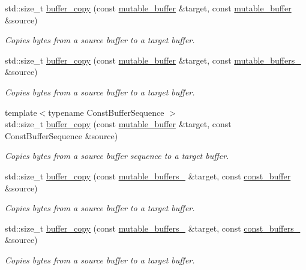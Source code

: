 \begin{DoxyCompactItemize}
std\+::size\+\_\+t \hyperlink{group__buffer__copy_gad7a03807f5083b423e1fff2173edf991}{buffer\+\_\+copy} (const \hyperlink{classasio_1_1mutable__buffer}{mutable\+\_\+buffer} \&target, const \hyperlink{classasio_1_1mutable__buffer}{mutable\+\_\+buffer} \&source)
\begin{DoxyCompactList}\small\item\em Copies bytes from a source buffer to a target buffer. \end{DoxyCompactList}\item 
std\+::size\+\_\+t \hyperlink{group__buffer__copy_ga8ed1b2c796b937a0b044df908ad4e3d8}{buffer\+\_\+copy} (const \hyperlink{classasio_1_1mutable__buffer}{mutable\+\_\+buffer} \&target, const \hyperlink{classasio_1_1mutable__buffers__1}{mutable\+\_\+buffers\+\_} \&source)
\begin{DoxyCompactList}\small\item\em Copies bytes from a source buffer to a target buffer. \end{DoxyCompactList}\item 
{\footnotesize template$<$typename Const\+Buffer\+Sequence $>$ }\\std\+::size\+\_\+t \hyperlink{group__buffer__copy_gae2aab004dd723dc638aeb08552e4c9a9}{buffer\+\_\+copy} (const \hyperlink{classasio_1_1mutable__buffer}{mutable\+\_\+buffer} \&target, const Const\+Buffer\+Sequence \&source)
\begin{DoxyCompactList}\small\item\em Copies bytes from a source buffer sequence to a target buffer. \end{DoxyCompactList}\item 
std\+::size\+\_\+t \hyperlink{group__buffer__copy_ga579f9adb02c3bc0b597f6a7bff4cf18e}{buffer\+\_\+copy} (const \hyperlink{classasio_1_1mutable__buffers__1}{mutable\+\_\+buffers\+\_} \&target, const \hyperlink{classasio_1_1const__buffer}{const\+\_\+buffer} \&source)
\begin{DoxyCompactList}\small\item\em Copies bytes from a source buffer to a target buffer. \end{DoxyCompactList}\item 
std\+::size\+\_\+t \hyperlink{group__buffer__copy_ga12327c4bafb7677e99bb0358bfe22605}{buffer\+\_\+copy} (const \hyperlink{classasio_1_1mutable__buffers__1}{mutable\+\_\+buffers\+\_} \&target, const \hyperlink{classasio_1_1const__buffers__1}{const\+\_\+buffers\+\_} \&source)
\begin{DoxyCompactList}\small\item\em Copies bytes from a source buffer to a target buffer. \end{DoxyCompactList}\item 

\end{DoxyCompactItemize}
